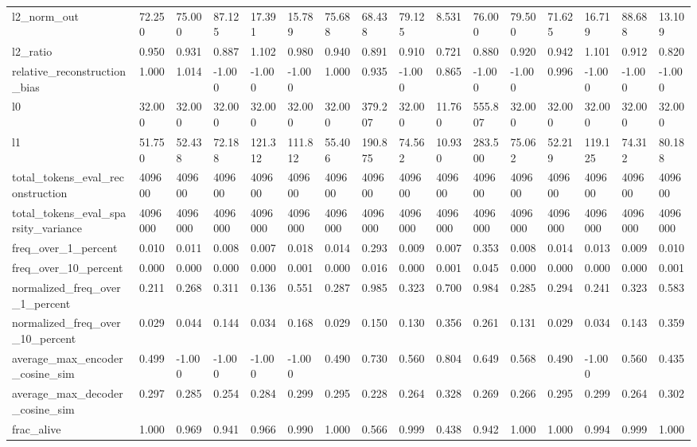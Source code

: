\begin{table}
\begin{tabular}{llllllllllllllll}
l2_norm_out & 72.250 & 75.000 & 87.125 & 17.391 & 15.789 & 75.688 & 68.438 & 79.125 & 8.531 & 76.000 & 79.500 & 71.625 & 16.719 & 88.688 & 13.109 \\
l2_ratio & 0.950 & 0.931 & 0.887 & 1.102 & 0.980 & 0.940 & 0.891 & 0.910 & 0.721 & 0.880 & 0.920 & 0.942 & 1.101 & 0.912 & 0.820 \\
relative_reconstruction_bias & 1.000 & 1.014 & -1.000 & -1.000 & -1.000 & 1.000 & 0.935 & -1.000 & 0.865 & -1.000 & -1.000 & 0.996 & -1.000 & -1.000 & -1.000 \\
l0 & 32.000 & 32.000 & 32.000 & 32.000 & 32.000 & 32.000 & 379.207 & 32.000 & 11.760 & 555.807 & 32.000 & 32.000 & 32.000 & 32.000 & 32.000 \\
l1 & 51.750 & 52.438 & 72.188 & 121.312 & 111.812 & 55.406 & 190.875 & 74.562 & 10.930 & 283.500 & 75.062 & 52.219 & 119.125 & 74.312 & 80.188 \\
total_tokens_eval_reconstruction & 409600 & 409600 & 409600 & 409600 & 409600 & 409600 & 409600 & 409600 & 409600 & 409600 & 409600 & 409600 & 409600 & 409600 & 409600 \\
total_tokens_eval_sparsity_variance & 4096000 & 4096000 & 4096000 & 4096000 & 4096000 & 4096000 & 4096000 & 4096000 & 4096000 & 4096000 & 4096000 & 4096000 & 4096000 & 4096000 & 4096000 \\
freq_over_1_percent & 0.010 & 0.011 & 0.008 & 0.007 & 0.018 & 0.014 & 0.293 & 0.009 & 0.007 & 0.353 & 0.008 & 0.014 & 0.013 & 0.009 & 0.010 \\
freq_over_10_percent & 0.000 & 0.000 & 0.000 & 0.000 & 0.001 & 0.000 & 0.016 & 0.000 & 0.001 & 0.045 & 0.000 & 0.000 & 0.000 & 0.000 & 0.001 \\
normalized_freq_over_1_percent & 0.211 & 0.268 & 0.311 & 0.136 & 0.551 & 0.287 & 0.985 & 0.323 & 0.700 & 0.984 & 0.285 & 0.294 & 0.241 & 0.323 & 0.583 \\
normalized_freq_over_10_percent & 0.029 & 0.044 & 0.144 & 0.034 & 0.168 & 0.029 & 0.150 & 0.130 & 0.356 & 0.261 & 0.131 & 0.029 & 0.034 & 0.143 & 0.359 \\
average_max_encoder_cosine_sim & 0.499 & -1.000 & -1.000 & -1.000 & -1.000 & 0.490 & 0.730 & 0.560 & 0.804 & 0.649 & 0.568 & 0.490 & -1.000 & 0.560 & 0.435 \\
average_max_decoder_cosine_sim & 0.297 & 0.285 & 0.254 & 0.284 & 0.299 & 0.295 & 0.228 & 0.264 & 0.328 & 0.269 & 0.266 & 0.295 & 0.299 & 0.264 & 0.302 \\
frac_alive & 1.000 & 0.969 & 0.941 & 0.966 & 0.990 & 1.000 & 0.566 & 0.999 & 0.438 & 0.942 & 1.000 & 1.000 & 0.994 & 0.999 & 1.000 \\
\bottomrule
\end{tabular}
\end{table}
